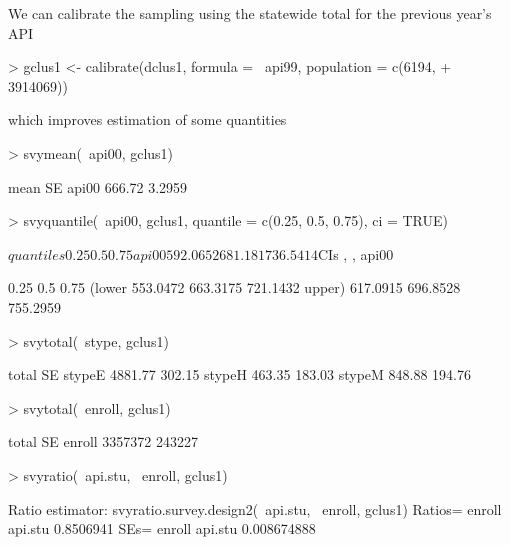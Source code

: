 \documentclass{article}
\begin{document}
We can calibrate the sampling using the statewide total for the previous year's API 
\begin{Schunk}
\begin{Sinput}
> gclus1 <- calibrate(dclus1, formula = ~api99, population = c(6194, 
+     3914069))
\end{Sinput}
\end{Schunk}
which improves estimation of some quantities
\begin{Schunk}
\begin{Sinput}
> svymean(~api00, gclus1)
\end{Sinput}
\begin{Soutput}
        mean     SE
api00 666.72 3.2959
\end{Soutput}
\begin{Sinput}
> svyquantile(~api00, gclus1, quantile = c(0.25, 0.5, 0.75), ci = TRUE)
\end{Sinput}
\begin{Soutput}
$quantiles
          0.25     0.5     0.75
api00 592.0652 681.181 736.5414

$CIs
, , api00

           0.25      0.5     0.75
(lower 553.0472 663.3175 721.1432
upper) 617.0915 696.8528 755.2959
\end{Soutput}
\begin{Sinput}
> svytotal(~stype, gclus1)
\end{Sinput}
\begin{Soutput}
         total     SE
stypeE 4881.77 302.15
stypeH  463.35 183.03
stypeM  848.88 194.76
\end{Soutput}
\begin{Sinput}
> svytotal(~enroll, gclus1)
\end{Sinput}
\begin{Soutput}
         total     SE
enroll 3357372 243227
\end{Soutput}
\begin{Sinput}
> svyratio(~api.stu, ~enroll, gclus1)
\end{Sinput}
\begin{Soutput}
Ratio estimator: svyratio.survey.design2(~api.stu, ~enroll, gclus1)
Ratios=
           enroll
api.stu 0.8506941
SEs=
             enroll
api.stu 0.008674888
\end{Soutput}
\end{Schunk}
\end{document}
